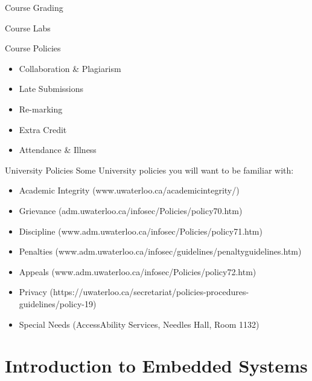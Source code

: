 \documentclass{beamer}
\begin{document}
	\begin{frame}{Course Grading}
		
	\end{frame}
	
	\begin{frame}{Course Labs}
		
	\end{frame}
  
	\begin{frame}{Course Policies}
		\begin{itemize}
			\setlength\itemsep{1em}
			\item Collaboration \& Plagiarism
			\item Late Submissions
			\item Re-marking
			\item Extra Credit
			\item Attendance \& Illness
		\end{itemize}
	\end{frame}
	
	\begin{frame}{University Policies}
		Some University policies you will want to be familiar with:
		\vspace{1em}
		\begin{itemize}
			\setlength\itemsep{0.75em}
			\item \normalsize{Academic Integrity} \tiny{(www.uwaterloo.ca/academicintegrity/)}
			\item \normalsize{Grievance} \tiny{(adm.uwaterloo.ca/infosec/Policies/policy70.htm)}
			\item \normalsize{Discipline} \tiny{(www.adm.uwaterloo.ca/infosec/Policies/policy71.htm)}
			\item \normalsize{Penalties} \tiny{(www.adm.uwaterloo.ca/infosec/guidelines/penaltyguidelines.htm)}
			\item \normalsize{Appeals} \tiny{(www.adm.uwaterloo.ca/infosec/Policies/policy72.htm)}
			\item \normalsize{Privacy} \tiny{(https://uwaterloo.ca/secretariat/policies-procedures-guidelines/policy-19)}
			\item \normalsize{Special Needs} \tiny{(AccessAbility Services, Needles Hall, Room 1132)}
		\end{itemize}
	\end{frame}  
  
	\section{Introduction to Embedded Systems}
	
\end{document}
